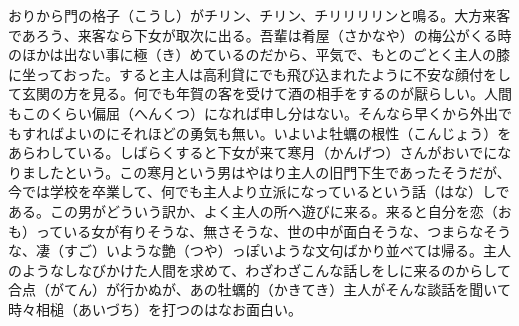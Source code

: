\documentclass{book}
\begin{document}
おりから門の格子（こうし）がチリン、チリン、チリリリリンと鳴る。大方来客であろう、来客なら下女が取次に出る。吾輩は肴屋（さかなや）の梅公がくる時のほかは出ない事に極（き）めているのだから、平気で、もとのごとく主人の膝に坐っておった。すると主人は高利貸にでも飛び込まれたように不安な顔付をして玄関の方を見る。何でも年賀の客を受けて酒の相手をするのが厭らしい。人間もこのくらい偏屈（へんくつ）になれば申し分はない。そんなら早くから外出でもすればよいのにそれほどの勇気も無い。いよいよ牡蠣の根性（こんじょう）をあらわしている。しばらくすると下女が来て寒月（かんげつ）さんがおいでになりましたという。この寒月という男はやはり主人の旧門下生であったそうだが、今では学校を卒業して、何でも主人より立派になっているという話（はな）しである。この男がどういう訳か、よく主人の所へ遊びに来る。来ると自分を恋（おも）っている女が有りそうな、無さそうな、世の中が面白そうな、つまらなそうな、凄（すご）いような艶（つや）っぽいような文句ばかり並べては帰る。主人のようなしなびかけた人間を求めて、わざわざこんな話しをしに来るのからして合点（がてん）が行かぬが、あの牡蠣的（かきてき）主人がそんな談話を聞いて時々相槌（あいづち）を打つのはなお面白い。
\end{document}
